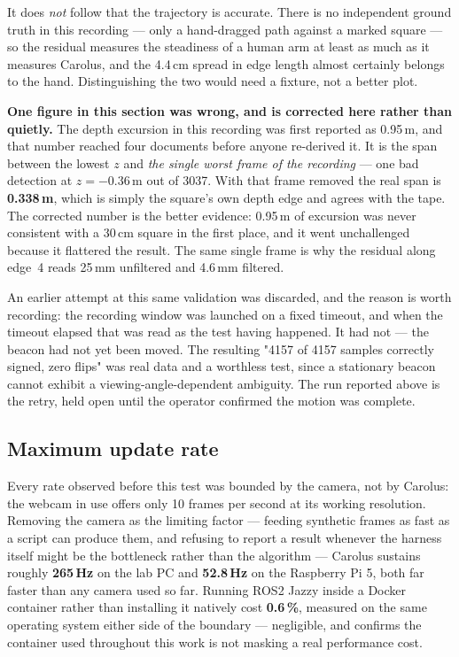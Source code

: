 \documentclass[11pt]{article}
\begin{document}
It does \emph{not} follow that the trajectory is accurate. There is no
independent ground truth in this recording --- only a hand-dragged path
against a marked square --- so the residual measures the steadiness of a
human arm at least as much as it measures Carolus, and the 4.4\,cm spread
in edge length almost certainly belongs to the hand. Distinguishing the two
would need a fixture, not a better plot.

\textbf{One figure in this section was wrong, and is corrected here rather
than quietly.} The depth excursion in this recording was first reported as
0.95\,m, and that number reached four documents before anyone re-derived
it. It is the span between the lowest $z$ and \emph{the single worst frame
of the recording} --- one bad detection at $z=-0.36$\,m out of 3037. With
that frame removed the real span is \textbf{0.338\,m}, which is simply the
square's own depth edge and agrees with the tape. The corrected number is
the better evidence: 0.95\,m of excursion was never consistent with a
30\,cm square in the first place, and it went unchallenged because it
flattered the result. The same single frame is why the residual along
edge~4 reads 25\,mm unfiltered and 4.6\,mm filtered.

An earlier attempt at this same validation was discarded, and the reason
is worth recording: the recording window was launched on a fixed timeout,
and when the timeout elapsed that was read as the test having happened.
It had not --- the beacon had not yet been moved. The resulting
"4157 of 4157 samples correctly signed, zero flips" was real data and a
worthless test, since a stationary beacon cannot exhibit a
viewing-angle-dependent ambiguity. The
run reported above is the retry, held open until the operator confirmed
the motion was complete.

\subsection{Maximum update rate}

Every rate observed before this test was bounded by the camera, not by
Carolus: the webcam in use offers only 10 frames per second at its working
resolution. Removing the camera as the limiting factor --- feeding
synthetic frames as fast as a script can produce them, and refusing to
report a result whenever the harness itself might be the bottleneck rather
than the algorithm --- Carolus sustains roughly \textbf{265\,Hz} on the lab
PC and \textbf{52.8\,Hz} on the Raspberry Pi 5, both far faster than any
camera used so far. Running ROS2 Jazzy inside a Docker container rather
than installing it natively cost \textbf{0.6\,\%}, measured on the same
operating system either side of the boundary --- negligible, and confirms
the container used throughout this work is not masking a real performance
cost.
\end{document}
